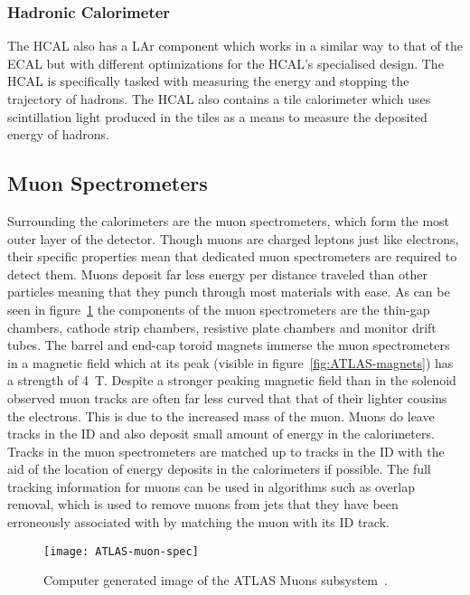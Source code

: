 \subsubsection{Hadronic Calorimeter}
The HCAL also has a LAr component which works in a similar way to that of the
ECAL but with different optimizations for the HCAL's specialised design. The
HCAL is specifically tasked with measuring the energy and stopping the
trajectory of hadrons. The HCAL also contains a tile calorimeter which uses
scintillation light produced in the tiles as a means to measure the deposited
energy of hadrons. 

\subsection{Muon Spectrometers}%
\label{sec:muon}

Surrounding the calorimeters are the muon spectrometers, which form the most
outer layer of the detector. Though muons are charged leptons just like
electrons, their specific properties mean that dedicated muon spectrometers are
required to detect them. Muons deposit far less energy per distance traveled
than other particles meaning that they punch through most materials with ease.
As can be seen in figure~\ref{fig:ATLAS-muon} the components of the muon
spectrometers are the thin-gap chambers, cathode strip chambers, resistive plate
chambers and monitor drift tubes. The barrel and end-cap toroid magnets immerse
the muon spectrometers in a magnetic field which at its peak (visible in
figure~\ref{fig:ATLAS-magnets}) has a strength of 4~T. Despite a stronger
peaking magnetic field than in the solenoid observed muon tracks are often far
less curved that that of their lighter cousins the electrons. This is due to the
increased mass of the muon. Muons do leave tracks in the ID and also deposit
small amount of energy in the calorimeters. Tracks in the muon spectrometers are
matched up to tracks in the ID with the aid of the location of energy deposits
in the calorimeters if possible. The full tracking information for muons can be
used in algorithms such as overlap removal, which is used to remove muons from
jets that they have been erroneously associated with by matching the muon with
its ID track.
\begin{figure}[h]
  \centering
  \texttt{[image: ATLAS-muon-spec]}
  \caption{Computer generated image of the ATLAS Muons
    subsystem~\cite{ATLAS-muon-fig}.}%
  \label{fig:ATLAS-muon}
\end{figure}

